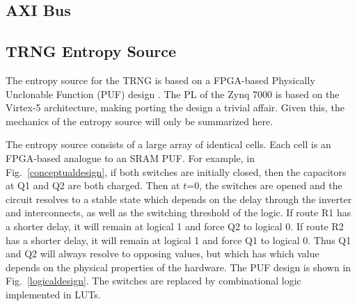 \documentclass[journal]{IEEEtran}
\begin{document}
\subsection{AXI Bus}

\subsection{TRNG Entropy Source}

The entropy source for the TRNG is based on a FPGA-based Physically Unclonable Function (PUF) design \cite{fpga_puf}. The PL of the Zynq 7000 is based on the Virtex-5 architecture, making porting the design a trivial affair. Given this,  the mechanics of the entropy source will only be summarized here. 

The entropy source consists of a large array of identical cells. Each cell is an FPGA-based analogue to an SRAM PUF. For example, in Fig.~\ref{conceptualdesign}, if both switches are initially closed, then the capacitors at Q1 and Q2 are both charged. Then at $t$=0, the switches are opened and the circuit resolves to a stable state which depends on the  delay through the inverter and interconnects, as well as the switching threshold of the logic. If route R1 has a shorter delay, it will remain at logical 1 and force Q2 to logical 0. If route R2 has a shorter delay, it will remain at logical 1 and force Q1 to logical 0. Thus Q1 and Q2 will always resolve to opposing values, but which has which value depends on the physical properties of the hardware.  The PUF design is shown in Fig.~\ref{logicaldesign}.  The switches are replaced by combinational logic implemented in LUTs.
\end{document}
